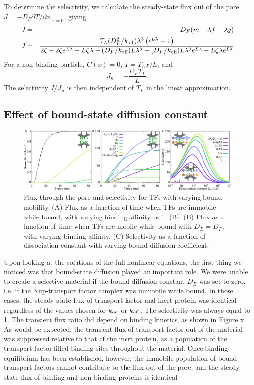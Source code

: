 To determine the selectivity, we calculate the steady-state flux out
of the pore\\ $ J =- D_F \partial T/\partial x|_{x=0}$, giving
\begin{eqnarray}
J& =&-D_F( m + \lambda f - \lambda g) \\
J&=& \frac{{T_L (D_F^2/k_{\rm off}) { \lambda}^3 \left(e^{L  \lambda}
     + 1\right)}}{2 \zeta - 2 \zeta e^{L  \lambda} + L \zeta
     \lambda - (D_F/k_{\rm off}) L  \lambda^3 - (D_F/k_{\rm off}) L  \lambda^3
     e^{L  \lambda} + L \zeta  \lambda e^{L  \lambda}} 
\end{eqnarray}
For a non-binding particle, $C(x) = 0$, $T = T_L x / L$, and
\begin{equation}
  J_n =-\frac{D_F T_L}{L}. 
\end{equation}
The selectivity $J/J_n$ is then independent of $T_L$ in
the linear approximation.

\subsection{Effect of bound-state diffusion constant}

\begin{figure}[t!]
\centering
\includegraphics[width=\textwidth]{figs/ch02/fig2.pdf}
\caption{Flux through the pore and selectivity for TFs with varying
  bound mobility. (A) Flux as a function of time when TFs are immobile
  while bound, with varying binding affinity as in (B).  (B) Flux as a function
  of time when TFs are mobile while bound with $D_B = D_F$, with
  varying binding affinity.  (C) Selectivity as a function of
  dissociation constant with varying bound diffusion coefficient. }
\label{fig:transient}
\end{figure}

Upon looking at the solutions of the full nonlinear equations, the first thing we noticed was that bound-state diffusion played an important role.  We were unable to create a selective material if the bound diffusion constant $D_B$ was set to zero, i.e. if the Nup-transport factor complex was immobile while bound.  In those cases, the steady-state flux of transport factor and inert protein was identical regardless of the values chosen for $k_{\rm on}$ or $k_{\rm off}$. The selectivity was always equal to 1.  The transient flux ratio did depend on binding kinetics, as shown in Figure x.  As would be expected, the transient flux of transport factor out of the material was suppressed relative to that of the inert protein, as a population of the transport factor filled binding sites throughout the material.  Once binding equilibrium has been established, however, the immobile population of bound transport factors cannot contribute to the flux out of the pore, and the steady-state flux of binding and non-binding proteins is identical.

